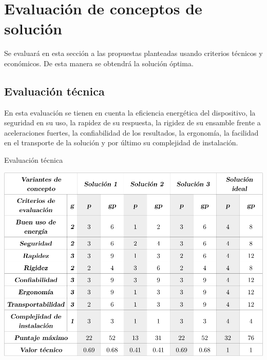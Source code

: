 \section{Evaluación de conceptos de solución}
Se evaluará en esta sección a las propuestas planteadas usando criterios técnicos y económicos. De esta manera se obtendrá la solución óptima.

\subsection{Evaluación técnica}
En esta evaluación se tienen en cuenta la eficiencia energética del dispositivo, la seguridad en su uso, la rapidez de su respuesta, la rigidez de su ensamble frente a aceleraciones fuertes, la confiabilidad de los resultados, la ergonomía, la facilidad en el transporte de la solución y por último su complejidad de instalación. 
\begin{table}[htb!]
  \centering
  \caption{Evaluación técnica}
  \label{diag:eval_tec}
  \includegraphics[width=0.95\linewidth]{eval_tec.pdf}
\end{table}



